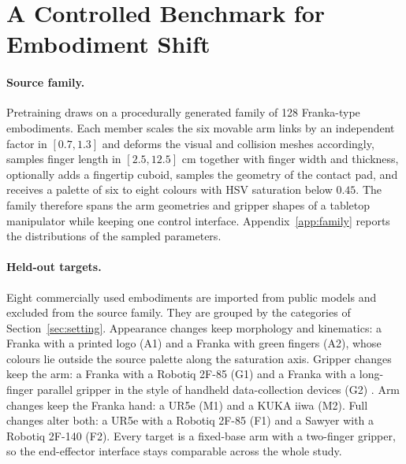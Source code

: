 \section{A Controlled Benchmark for Embodiment Shift}
\label{sec:bench}

\paragraph{Source family.}
Pretraining draws on a procedurally generated family of 128 Franka-type embodiments. Each member scales the six movable arm links by an independent factor in $[0.7, 1.3]$ and deforms the visual and collision meshes accordingly, samples finger length in $[2.5, 12.5]$ cm together with finger width and thickness, optionally adds a fingertip cuboid, samples the geometry of the contact pad, and receives a palette of six to eight colours with HSV saturation below $0.45$. The family therefore spans the arm geometries and gripper shapes of a tabletop manipulator while keeping one control interface. Appendix~\ref{app:family} reports the distributions of the sampled parameters.

\paragraph{Held-out targets.}
Eight commercially used embodiments are imported from public models \citep{zhu2020robosuite, todorov2012mujoco} and excluded from the source family. They are grouped by the categories of Section~\ref{sec:setting}. Appearance changes keep morphology and kinematics: a Franka with a printed logo (A1) and a Franka with green fingers (A2), whose colours lie outside the source palette along the saturation axis. Gripper changes keep the arm: a Franka with a Robotiq 2F-85 (G1) and a Franka with a long-finger parallel gripper in the style of handheld data-collection devices (G2) \citep{chi2024umi}. Arm changes keep the Franka hand: a UR5e (M1) and a KUKA iiwa (M2). Full changes alter both: a UR5e with a Robotiq 2F-85 (F1) and a Sawyer with a Robotiq 2F-140 (F2). Every target is a fixed-base arm with a two-finger gripper, so the end-effector interface stays comparable across the whole study.

